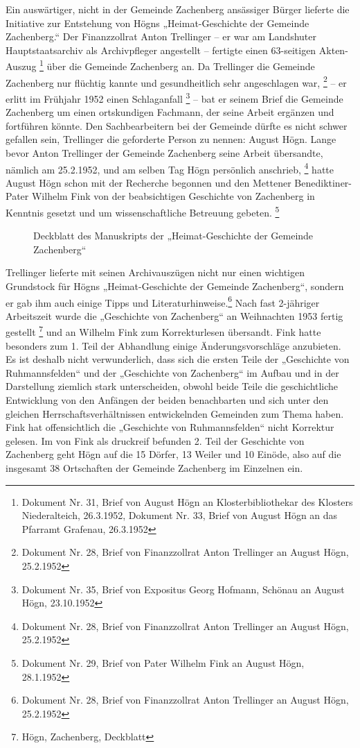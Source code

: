 Ein auswärtiger, nicht in der Gemeinde Zachenberg ansässiger Bürger
lieferte die Initiative zur Entstehung von Högns „Heimat-Geschichte der
Gemeinde Zachenberg.“ Der Finanzzollrat Anton Trellinger – er war am
Landshuter Hauptstaatsarchiv als Archivpfleger angestellt – fertigte
einen 63-seitigen Akten-Auszug \footnote{Dokument Nr. 31, Brief von
August Högn an Klosterbibliothekar des Klosters Niederalteich,
26.3.1952, Dokument Nr. 33, Brief von August Högn an das Pfarramt
Grafenau, 26.3.1952} über die Gemeinde Zachenberg an. Da Trellinger die
Gemeinde Zachenberg nur flüchtig kannte und gesundheitlich sehr
angeschlagen war, \footnote{Dokument Nr. 28, Brief von Finanzzollrat
Anton Trellinger an August Högn, 25.2.1952} – er erlitt im Frühjahr
1952 einen Schlaganfall \footnote{Dokument Nr. 35, Brief von Expositus
Georg Hofmann, Schönau an August Högn, 23.10.1952} – bat er seinem
Brief die Gemeinde Zachenberg um einen ortskundigen Fachmann, der seine
Arbeit ergänzen und fortführen könnte. Den Sachbearbeitern bei der
Gemeinde dürfte es nicht schwer gefallen sein, Trellinger die
geforderte Person zu nennen: August Högn. Lange bevor Anton Trellinger
der Gemeinde Zachenberg seine Arbeit übersandte, nämlich am 25.2.1952,
und am selben Tag Högn persönlich anschrieb, \footnote{Dokument Nr. 28,
Brief von Finanzzollrat Anton Trellinger an August Högn, 25.2.1952}
hatte August Högn schon mit der Recherche begonnen und den Mettener
Benediktiner-Pater Wilhelm Fink von der beabsichtigen Geschichte von
Zachenberg in Kenntnis gesetzt und um wissenschaftliche Betreuung
gebeten. \footnote{Dokument Nr. 29, Brief von Pater Wilhelm Fink an
August Högn, 28.1.1952}

\begin{figure}
\caption{Deckblatt des Manuskripts der „Heimat-Geschichte der Gemeinde Zachenberg“}
\end{figure}

Trellinger lieferte mit seinen Archivauszügen nicht nur einen wichtigen
Grundstock für Högns „Heimat-Geschichte der Gemeinde Zachenberg“,
sondern er gab ihm auch einige Tipps und Literaturhinweise.\footnote{
Dokument Nr. 28, Brief von Finanzzollrat Anton Trellinger an August
Högn, 25.2.1952} Nach fast 2-jähriger Arbeitszeit wurde die „Geschichte
von Zachenberg“ an Weihnachten 1953 fertig gestellt \footnote{Högn,
Zachenberg, Deckblatt} und an Wilhelm Fink zum Korrekturlesen
übersandt. Fink hatte besonders zum 1. Teil der Abhandlung einige
Änderungsvorschläge anzubieten. Es ist deshalb nicht verwunderlich,
dass sich die ersten Teile der „Geschichte von Ruhmannsfelden“ und der
„Geschichte von Zachenberg“ im Aufbau und in der Darstellung ziemlich
stark unterscheiden, obwohl beide Teile die geschichtliche Entwicklung
von den Anfängen der beiden benachbarten und sich unter den gleichen
Herrschaftsverhältnissen entwickelnden Gemeinden zum Thema haben. Fink
hat offensichtlich die „Geschichte von Ruhmannsfelden“ nicht Korrektur
gelesen. Im von Fink als druckreif befunden 2. Teil der Geschichte von
Zachenberg geht Högn auf die 15 Dörfer, 13 Weiler und 10 Einöde, also
auf die insgesamt 38 Ortschaften der Gemeinde Zachenberg im Einzelnen
ein.

